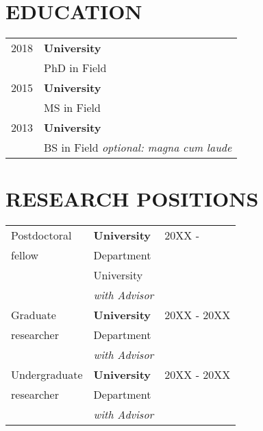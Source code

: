 \documentclass[line,10pt]{res}
\begin{document}
\null\hspace{0in}{\large\bf Name}\\[0.5em]
\null\hspace{0.5em}{Affil}\\
\null\hspace{0.5em}{University}\\
\null\hspace{0.5em}{email (at) email (dot) edu}\\
\null\hspace{0.5em}{Website}%
\vspace{1em}

\begin{resume}



\section{\bf EDUCATION}
\vspace{1em}
\begin{tabular}{p{1.0in} p{5.5in}}
 2018 & \textbf{University}\\
      & PhD in Field\\[0.8em]
 2015 & \textbf{University}\\
      & MS in Field\\[0.8em]
 2013 & \textbf{University}\\
      & BS in Field \textit{optional: magna cum laude}\\
\end{tabular}

\section{\bf RESEARCH POSITIONS} %
\vspace{1em}

\begin{tabular}{p{1.0in} p{4.5in} p{1in}}
 Postdoctoral & \textbf{University} & 20XX - \\
     fellow   & Department  & \\
              & University & \\
              & \textit{with Advisor} & \\[0.8em]
 Graduate  & \textbf{University} & 20XX - 20XX\\
researcher & Department & \\
           & \textit{with Advisor} & \\[0.8em]
 Undergraduate & \textbf{University} & 20XX - 20XX\\
  researcher   & Department& \\
               &\textit{with Advisor} & \\
\end{tabular}


\end{resume}
\end{document}
